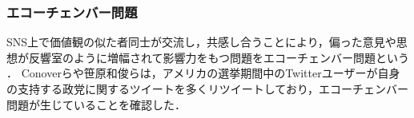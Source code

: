 \documentclass[12pt,a4j]{jreport}
\begin{document}


\subsubsection{エコーチェンバー問題}
SNS上で価値観の似た者同士が交流し，共感し合うことにより，偏った意見や思想が反響室のように増幅されて影響力をもつ問題をエコーチェンバー問題という\cite{bruns_filter_2019}
\cite{nguyen_echo_2020}．
Conoverらや笹原和俊らは，アメリカの選挙期間中のTwitterユーザーが自身の支持する政党に関するツイートを多くリツイートしており，エコーチェンバー問題が生じていることを確認した\cite{conover_partisan_2012}\cite{__2020-5}．
\end{document}
